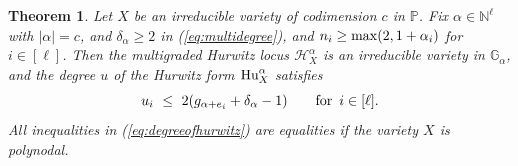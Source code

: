\documentclass[12pt]{article}
\newtheorem{theorem}{Theorem}[section]
\theoremstyle{definition}
\newcommand{\bN}{\mathbb N}
\newcommand{\bG}{\mathbb G}
\newcommand{\bP}{\mathbb P}
\newcommand{\cH}{\mathcal H}
\begin{document}
\begin{theorem} \label{thm:degree}
	Let $X$ be an irreducible variety of codimension $c$ in $\bP$. 
	Fix $\alpha  \in \bN^\ell$ with $|\alpha| = c$, and
		$\delta_\alpha \geq 2$ in (\ref{eq:multidegree}),
		and $n_i \geq {\rm max}(2,1+\alpha_i)$
	 	  for $i\in[\ell]$.
Then  the multigraded Hurwitz locus  $\cH^\alpha_X$ is an irreducible variety in $\bG_\alpha$, and
the degree $u$ of the     Hurwitz form ${\rm Hu}^\alpha_X$ satisfies
\begin{equation}
\label{eq:degreeofhurwitz}
        u_i \,\,\le\,\, 2 (g_{\alpha+e_i}+\delta_\alpha - 1) \qquad \hbox{for}  \,\,\, i \in [\ell].
\end{equation}
All inequalities in (\ref{eq:degreeofhurwitz}) are equalities if the variety $X$ is polynodal.
\end{theorem}
\end{document}
